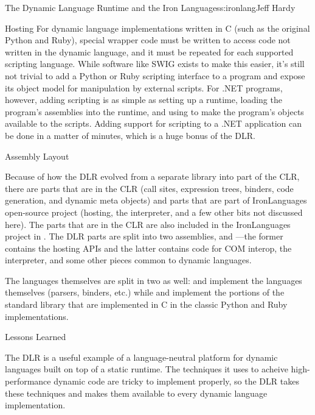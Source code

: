 \begin{aosachapter}{The Dynamic Language Runtime and the Iron Languages}{s:ironlang}{Jeff Hardy}
\begin{aosasect1}{Hosting}
For dynamic language implementations written in C (such as the original Python
and Ruby), special wrapper code must be written to access code not written in
the dynamic language, and it must be repeated for each supported scripting
language. While software like SWIG exists to make this easier, it's still not
trivial to add a Python or Ruby scripting interface to a program and expose its
object model for manipulation by external scripts. For .NET programs, however,
adding scripting is as simple as setting up a runtime, loading the program's
assemblies into the runtime, and using  to make
the program's objects available to the scripts. Adding support for scripting to
a .NET application can be done in a matter of minutes, which is a huge bonus of
the DLR.

\end{aosasect1}

\begin{aosasect1}{Assembly Layout}

Because of how the DLR evolved from a separate library into part of the CLR,
there are parts that are in the CLR (call sites, expression trees, binders,
code generation, and dynamic meta objects) and parts that are part of
IronLanguages open-source project (hosting, the interpreter, and a few other
bits not discussed here). The parts that are in the CLR are also included in
the IronLanguages project in . The DLR parts are
split into two assemblies,  and
---the former contains the hosting APIs and the latter
contains code for COM interop, the interpreter, and some other pieces common to
dynamic languages.

The languages themselves are split in two as well:  and
 implement the languages themselves (parsers, binders, etc.)
while  and  implement
the portions of the standard library that are implemented in C in the classic
Python and Ruby implementations.

\end{aosasect1}

\begin{aosasect1}{Lessons Learned}

The DLR is a useful example of a language-neutral platform for dynamic
languages built on top of a static runtime. The techniques it uses to acheive
high-performance dynamic code are tricky to implement properly, so the DLR
takes these techniques and makes them available to every dynamic language
implementation.


\end{aosasect1}
\end{aosachapter}
